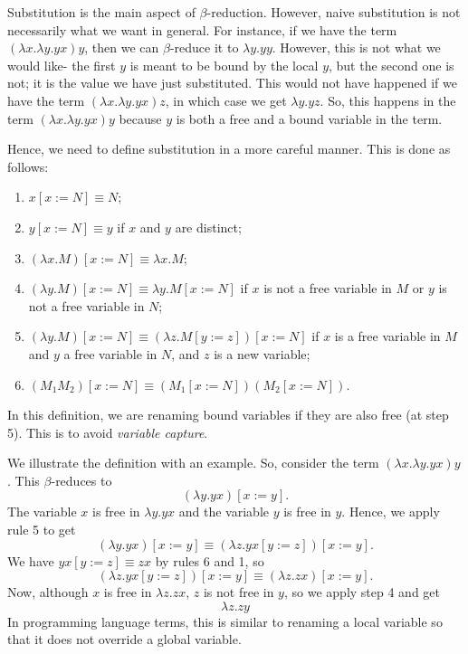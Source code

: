 \documentclass[a4paper, openany]{memoir}
\theoremstyle{definition}
\begin{document}
    Substitution is the main aspect of $\beta$-reduction. However, naive substitution is not necessarily what we want in general. For instance, if we have the term $(\lambda x.\lambda y.yx) y$, then we can $\beta$-reduce it to $\lambda y. yy$. However, this is not what we would like- the first $y$ is meant to be bound by the local $y$, but the second one is not; it is the value we have just substituted. This would not have happened if we have the term $(\lambda x. \lambda y. yx)z$, in which case we get $\lambda y.yz$. So, this happens in the term $(\lambda x. \lambda y. yx)y$ because $y$ is both a free and a bound variable in the term.

    Hence, we need to define substitution in a more careful manner. This is done as follows:
    \begin{enumerate}
        \item $x[x := N] \equiv N$;
        \item $y[x := N] \equiv y$ if $x$ and $y$ are distinct;
        \item $(\lambda x.M)[x := N] \equiv \lambda x.M$;
        \item $(\lambda y.M)[x := N] \equiv \lambda y. M[x := N]$ if $x$ is not a free variable in $M$ or $y$ is not a free variable in $N$;
        \item $(\lambda y.M)[x := N] \equiv (\lambda z.M[y:=z])[x := N]$ if $x$ is a free variable in $M$ and $y$ a free variable in $N$, and $z$ is a new variable;
        \item $(M_1 M_2)[x := N] \equiv (M_1[x := N])(M_2[x := N])$.
    \end{enumerate}
    In this definition, we are renaming bound variables if they are also free (at step 5). This is to avoid \emph{variable capture}.
    
    We illustrate the definition with an example. So, consider the term $(\lambda x.\lambda y.yx)y$. This $\beta$-reduces to
    \[(\lambda y.yx)[x := y].\]
    The variable $x$ is free in $\lambda y.yx$ and the variable $y$ is free in $y$. Hence, we apply rule 5 to get
    \[(\lambda y.yx)[x := y] \equiv (\lambda z.yx[y := z])[x := y].\]
    We have $yx[y := z] \equiv zx$ by rules 6 and 1, so
    \[(\lambda z.yx[y := z])[x := y] \equiv (\lambda z.zx)[x := y].\]
    Now, although $x$ is free in $\lambda z.zx$, $z$ is not free in $y$, so we apply step 4 and get
    \[\lambda z.zy\]
    In programming language terms, this is similar to renaming a local variable so that it does not override a global variable.
    
\end{document}
